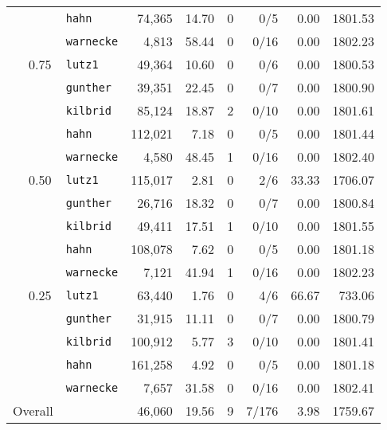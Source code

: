 \begin{table}[tpb]
\begin{tabular}{cclrrrrrr}
		&		& {\tt hahn}	& 74,365 & 14.70 & 0 & 0/5 & 0.00 & 1801.53 \\
		&		& {\tt warnecke}	& 4,813 & 58.44 & 0 & 0/16 & 0.00 & 1802.23 \\
		& 0.75	& {\tt lutz1}	& 49,364 & 10.60 & 0 & 0/6 & 0.00 & 1800.53 \\
		&		& {\tt gunther}	& 39,351 & 22.45 & 0 & 0/7 & 0.00 & 1800.90 \\
		&		& {\tt kilbrid}	& 85,124 & 18.87 & 2 & 0/10 & 0.00 & 1801.61 \\
		&		& {\tt hahn}	& 112,021 & 7.18 & 0 & 0/5 & 0.00 & 1801.44 \\
		&		& {\tt warnecke}	& 4,580 & 48.45 & 1 & 0/16 & 0.00 & 1802.40 \\
		& 0.50	& {\tt lutz1}	& 115,017 & 2.81 & 0 & 2/6 & 33.33 & 1706.07 \\
		&		& {\tt gunther}	& 26,716 & 18.32 & 0 & 0/7 & 0.00 & 1800.84 \\
		&		& {\tt kilbrid}	& 49,411 & 17.51 & 1 & 0/10 & 0.00 & 1801.55 \\
		&		& {\tt hahn}	& 108,078 & 7.62 & 0 & 0/5 & 0.00 & 1801.18 \\
		&		& {\tt warnecke}	& 7,121 & 41.94 & 1 & 0/16 & 0.00 & 1802.23 \\
		& 0.25	& {\tt lutz1}	& 63,440 & 1.76 & 0 & 4/6 & 66.67 & 733.06 \\
		&		& {\tt gunther}	& 31,915 & 11.11 & 0 & 0/7 & 0.00 & 1800.79 \\
		&		& {\tt kilbrid}	& 100,912 & 5.77 & 3 & 0/10 & 0.00 & 1801.41 \\
		&		& {\tt hahn}	& 161,258 & 4.92 & 0 & 0/5 & 0.00 & 1801.18 \\
		&		& {\tt warnecke}	& 7,657 & 31.58 & 0 & 0/16 & 0.00 & 1802.41 \\[1mm]
		\multicolumn{2}{l}{Overall} & & 46,060 & 19.56 & 9 & 7/176 & 3.98 & 1759.67 \\
		\bottomrule
	\end{tabular}
	\label{tab:appen:mipfsbf}
\end{table}


